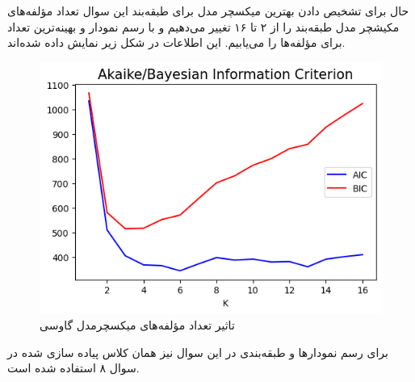 \documentclass[12pt,onecolumn,a4paper]{article}
\begin{document}
حال برای تشخیص دادن بهترین میکسچر مدل برای طبقه‌بند این سوال تعداد مؤلفه‌های مکیشچر مدل طبقه‌بند را از ۲ تا ۱۶ تغییر می‌دهیم و با رسم نمودار  و  بهینه‌ترین تعداد برای مؤلفه‌ها را می‌یابیم. این اطلاعات در شکل زیر نمایش داده شده‌اند.
\begin{figure}[h!]
    \label{fig:5}
    \begin{center}
    \includegraphics[scale=0.6]{q10_aicbic.png}
    \caption{تاثیر تعداد مؤلفه‌های میکسچرمدل گاوسی}
    \end{center}
\end{figure}

برای رسم نمودارها و طبقه‌بندی در این سوال نیز همان کلاس پیاده سازی شده در سوال ۸ استفاده شده است. 
\end{document}
